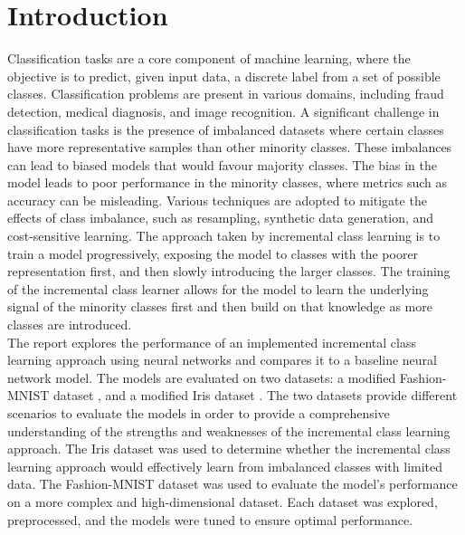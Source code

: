 \documentclass[conference]{IEEEtran}
\begin{document}
\section{Introduction}
Classification tasks are a core component of machine learning, where the objective is to predict, given input data, a discrete label from a set of possible classes. Classification 
problems are present in various domains, including fraud detection, medical diagnosis, and image recognition. A significant challenge in classification tasks is the presence of 
imbalanced datasets where certain classes have more representative samples than other minority classes. These imbalances can lead to biased models that would favour majority classes. The bias 
in the model leads to poor performance in the minority classes, where metrics such as accuracy can be misleading. Various techniques are adopted to mitigate the effects of class imbalance, such as 
resampling, synthetic data generation, and cost-sensitive learning. The approach taken by incremental class learning is to train a model progressively, exposing the model to 
classes with the poorer representation first, and then slowly introducing the larger classes. The training of the incremental class learner allows for the model to 
learn the underlying signal of the minority classes first and then build on that knowledge as more classes are introduced.\\

The report explores the performance of an implemented incremental class learning approach using neural networks and compares it to a baseline neural network model. The models 
are evaluated on two datasets: a modified Fashion-MNIST dataset \cite{xiao2017fashionmnist}, and a modified Iris dataset \cite{fisher1936iris}. The two datasets 
provide different scenarios to evaluate the models in order to provide a comprehensive understanding of the strengths and weaknesses of the incremental class learning approach. The Iris dataset was 
used to determine whether the incremental class learning approach would effectively learn from imbalanced classes with limited data. The 
Fashion-MNIST dataset was used to evaluate the model's performance on a more complex and high-dimensional dataset. Each dataset 
was explored, preprocessed, and the models were tuned to ensure optimal performance. \\
\end{document}
